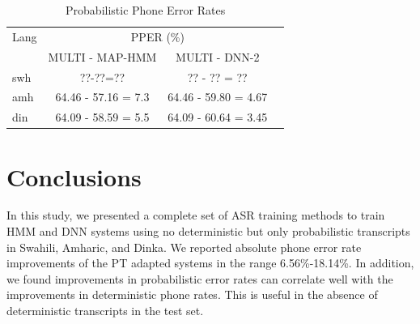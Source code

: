 \documentclass[a4paper]{article}
\begin{document}
\begin{table}
\centering %
\begin{tabular}{l|c c c}
   \hline
Lang  & \multicolumn{2}{c}{PPER (\%)} \\
          &  MULTI - MAP-HMM & MULTI - DNN-2  \\ \hline
swh      &  ??-??=?? & ?? - ?? = ??  \\
amh      & 64.46 - 57.16 = 7.3   & 64.46 - 59.80 = 4.67  \\ 
din     &64.09 - 58.59 = 5.5   &64.09 - 60.64 = 3.45 \\ \hline
\end{tabular}
\caption{Probabilistic Phone Error Rates} \label{Tab:PPER}
\vspace{-5mm}
\end{table}

\vspace{-3mm}
\section{Conclusions}
In this study, we presented a complete set of ASR training methods to train HMM and DNN systems using no deterministic but only probabilistic transcripts in Swahili, Amharic, and Dinka. We reported absolute phone error rate improvements of the PT adapted systems in the range 6.56\%-18.14\%. In addition, we found improvements in probabilistic error rates can correlate well with the improvements in deterministic phone rates. This is useful in the absence of deterministic transcripts in the test set.


\clearpage
\newpage
\eightpt



\end{document}

